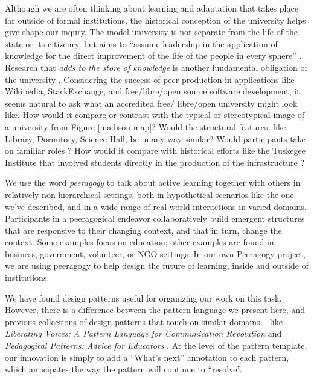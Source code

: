 Although we are often thinking about learning and adaptation that
takes place far outside of formal institutions, the historical
conception of the university helps give shape our inqury.
%
The model university is not separate from the life of the state or its
citizenry, but aims to ``assume leadership in the application of
knowledge for the direct improvement of the life of the people in
every sphere'' \cite[p.~88]{curti1949university}. Research that
\emph{adds to the store of knowledge} is another fundamental
obligation of the university \cite[p.~550]{curti1949university}.
%
Considering the success of peer production in applications like
Wikipedia, StackExchange, and free/libre/open source software
development, it seems natural to ask what an accredited free\slash
libre\slash open university might look like.  How would it compare or
contrast with the typical or stereotypical image of a university from
Figure \ref{madison-map}?  Would the structural features, like
Library, Dormitory, Science Hall, be in any way similar?  Would
participants take on familiar roles \cite{corneli+crowdsourcing}?  How
would it compare with historical efforts like the Tuskegee Institute
that involved students directly in the production of the
infrastructure \cite{building-peeragogy-accelerator}?

We use the word \emph{peeragogy} to talk about active learning
together with others in relatively non-hierarchical settings, both in
hypothetical scenarios like the one we've described, and in a wide
range of real-world interactions in varied domains.  Participants in a
peeragogical endeavor collaboratively build emergent structures that
are responsive to their changing context, and that in turn, change the
context.  Some examples focus on education; other examples are found
in business, government, volunteer, or NGO settings.  In our own
Peeragogy project, we are using peeragogy to help design the future of
learning, inside and outside of institutions.

We have found design patterns useful for organizing our work on this task.  However, there is a difference between the pattern language we present here, and previous collections of design patterns that touch on similar domains -- like \emph{Liberating Voices: A Pattern Language for Communication Revolution} \cite{schuler2008liberating} and \emph{Pedagogical Patterns: Advice for Educators} \cite{bergin2012pedagogical}.  At the level of the pattern template, our innovation is simply to add a ``What's next'' annotation to each pattern, which anticipates the way the pattern will continue to ``resolve''. 

